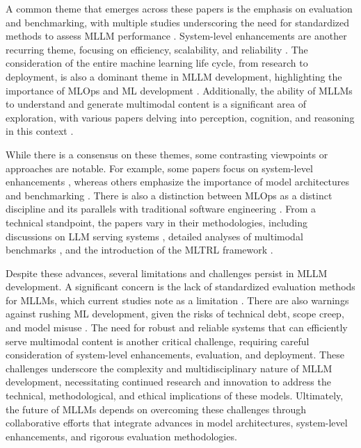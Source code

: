 \documentclass[conference]{IEEEtran}
\begin{document}
A common theme that emerges across these papers is the emphasis on evaluation and benchmarking, with multiple studies underscoring the need for standardized methods to assess MLLM performance \cite{b3, b4}. System-level enhancements are another recurring theme, focusing on efficiency, scalability, and reliability \cite{b1}. The consideration of the entire machine learning life cycle, from research to deployment, is also a dominant theme in MLLM development, highlighting the importance of MLOps and ML development \cite{b2, b5}. Additionally, the ability of MLLMs to understand and generate multimodal content is a significant area of exploration, with various papers delving into perception, cognition, and reasoning in this context \cite{b3, b4}.

While there is a consensus on these themes, some contrasting viewpoints or approaches are notable. For example, some papers focus on system-level enhancements \cite{b1, b5}, whereas others emphasize the importance of model architectures and benchmarking \cite{b3, b4}. There is also a distinction between MLOps as a distinct discipline \cite{b2} and its parallels with traditional software engineering \cite{b5}. From a technical standpoint, the papers vary in their methodologies, including discussions on LLM serving systems \cite{b1}, detailed analyses of multimodal benchmarks \cite{b3, b4}, and the introduction of the MLTRL framework \cite{b5}.

Despite these advances, several limitations and challenges persist in MLLM development. A significant concern is the lack of standardized evaluation methods for MLLMs, which current studies note as a limitation \cite{b3, b4}. There are also warnings against rushing ML development, given the risks of technical debt, scope creep, and model misuse \cite{b5}. The need for robust and reliable systems that can efficiently serve multimodal content is another critical challenge, requiring careful consideration of system-level enhancements, evaluation, and deployment. These challenges underscore the complexity and multidisciplinary nature of MLLM development, necessitating continued research and innovation to address the technical, methodological, and ethical implications of these models. Ultimately, the future of MLLMs depends on overcoming these challenges through collaborative efforts that integrate advances in model architectures, system-level enhancements, and rigorous evaluation methodologies.
\end{document}
